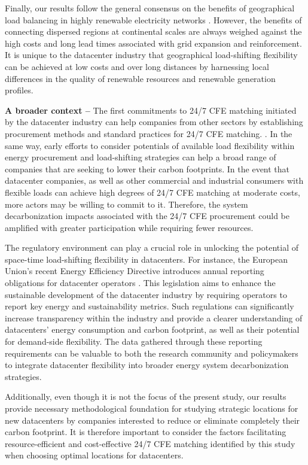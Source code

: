 Finally, our results follow the general consensus on the benefits of geographical load balancing in highly renewable electricity networks \cite{schlachtbergerBenefitsCooperationHighly2017}.
However, the benefits of connecting dispersed regions at continental scales are always weighed against the high costs and long lead times associated with grid expansion and reinforcement.
It is unique to the datacenter industry that geographical load-shifting flexibility can be achieved at low costs and over long distances by harnessing local differences in the quality of renewable resources and renewable generation profiles.

\textbf{A broader context --} The first commitments to 24/7 CFE matching initiated by the datacenter industry can help companies from other sectors by establishing procurement methods and standard practices for 24/7 CFE matching. \cite{xu-247CFE-report}.
In the same way, early efforts to consider potentials of available load flexibility within energy procurement and load-shifting strategies can help a broad range of companies that are seeking to lower their carbon footprints.
In the event that datacenter companies, as well as other commercial and industrial consumers with flexible loads can achieve high degrees of 24/7 CFE matching at moderate costs, more actors may be willing to commit to it.
Therefore, the system decarbonization impacts associated with the 24/7 CFE procurement \cite{riepinMeansCostsSystemlevel2023} could be amplified with greater participation while requiring fewer resources.

The regulatory environment can play a crucial role in unlocking the potential of space-time load-shifting flexibility in datacenters.
For instance, the European Union's recent Energy Efficiency Directive introduces annual reporting obligations for datacenter operators \cite{DirectiveEU20232023}.
This legislation aims to enhance the sustainable development of the datacenter industry by requiring operators to report key energy and sustainability metrics.
Such regulations can significantly increase transparency within the industry and provide a clearer understanding of datacenters' energy consumption and carbon footprint, as well as their potential for demand-side flexibility.
The data gathered through these reporting requirements can be valuable to both the research community and policymakers to integrate datacenter flexibility into broader energy system decarbonization strategies.

Additionally, even though it is not the focus of the present study, our results provide necessary methodological foundation for studying strategic locations for new datacenters by companies interested to reduce or eliminate completely their carbon footprint. It is therefore important to consider the factors facilitating resource-efficient and cost-effective 24/7 CFE matching identified by this study when choosing optimal locations for datacenters.

